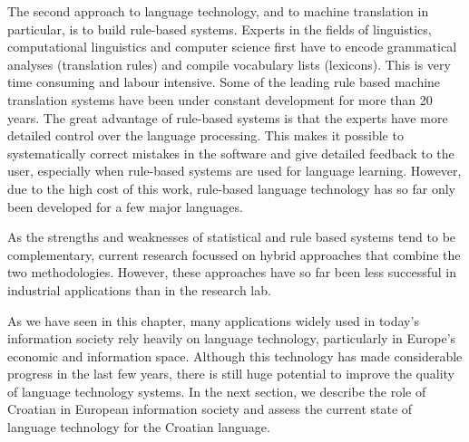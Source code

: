 \begin{multicols}{2}
The second approach to language technology, and to machine translation in particular, is to build rule-based systems. Experts in the fields of linguistics, computational linguistics and computer science first have to encode grammatical analyses (translation rules) and compile vocabulary lists (lexicons). This is very time consuming and labour intensive. Some of the leading rule based machine translation systems have been under constant development for more than 20 years. The great advantage of rule-based systems is that the experts have more detailed control over the language processing. This makes it possible to systematically correct mistakes in the software and give detailed feedback to the user, especially when rule-based systems are used for language learning. However, due to the high cost of this work, rule-based language technology has so far only been developed for a few major languages.


As the strengths and weaknesses of statistical and rule based systems tend to be complementary, current research focussed on hybrid approaches that combine the two methodologies. However, these approaches have so far been less successful in industrial applications than in the research lab. 

As we have seen in this chapter, many applications widely used in today’s information society rely heavily on language technology, particularly in Europe’s economic and information space. Although this technology has made considerable progress in the last few years, there is still huge potential to improve the quality of language technology systems. In the next section, we describe the role of Croatian in European information society and assess the current state of language technology for the Croatian language.

\end{multicols}

\clearpage


